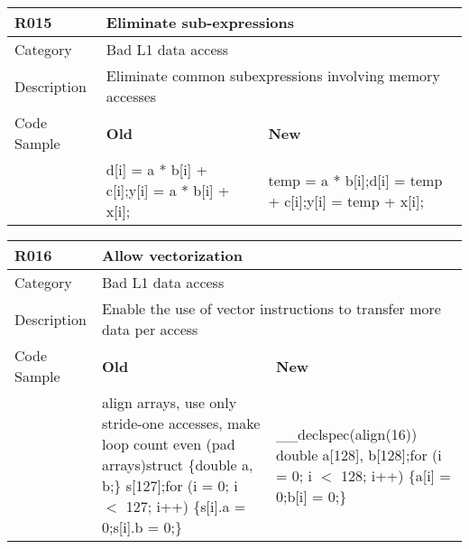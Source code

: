 \begin{tabular}{|p{0.9in}|p{2.0in}|p{2.0in}|} \hline
\textbf{R015}       & \multicolumn{2}{|p{4.0in}|}{\textbf{Eliminate sub-expressions}} \\ \hline
Category            & \multicolumn{2}{|p{4.0in}|}{Bad L1 data access} \\ \hline
Description         & \multicolumn{2}{|p{4.0in}|}{Eliminate common subexpressions involving memory accesses} \\ \hline
Code Sample         & \textbf{Old} & \textbf{New} \\ \hline
                    & d[i] = a * b[i] + c[i];\newline y[i] = a * b[i] + x[i];
                    & temp = a * b[i];\newline d[i] = temp + c[i];\newline y[i] = temp + x[i]; \\ \hline
\end{tabular}

\begin{tabular}{|p{0.9in}|p{2.0in}|p{2.0in}|} \hline
\textbf{R016}       & \multicolumn{2}{|p{4.0in}|}{\textbf{Allow vectorization}} \\ \hline
Category            & \multicolumn{2}{|p{4.0in}|}{Bad L1 data access} \\ \hline
Description         & \multicolumn{2}{|p{4.0in}|}{Enable the use of vector instructions to transfer more data per access} \\ \hline
Code Sample         & \textbf{Old} & \textbf{New} \\ \hline
                    & align arrays, use only stride-one accesses, make loop count even (pad arrays)\newline struct \{\newline   double a, b;\newline \} s[127];\newline for (i = 0; i $<$ 127; i++) \{\newline   s[i].a = 0;\newline   s[i].b = 0;\newline \}
                    & \_\_declspec(align(16)) double a[128], b[128];\newline for (i = 0; i $<$ 128; i++) \{\newline   a[i] = 0;\newline   b[i] = 0;\newline \} \\ \hline
\end{tabular}

